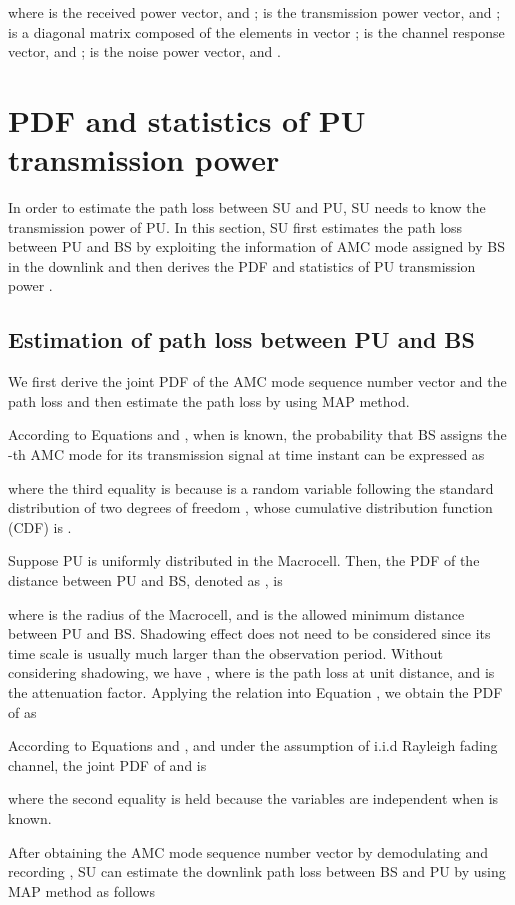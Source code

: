 \documentclass[conference]{IEEEtran}
\begin{document}
where  is the received power vector, and ;
 is the transmission power vector, and ;
 is a diagonal matrix composed of
the elements in vector ;  is the channel
response vector, and ;  is the noise power
vector, and .
\section{PDF and statistics of PU transmission power}
In order to estimate the path loss between SU and PU, SU needs to
know the transmission power of PU. In this section, SU first
estimates the path loss between PU and BS by exploiting the
information of AMC mode assigned by BS in the downlink and then
derives the PDF and statistics of PU transmission power
.
\subsection{Estimation of path loss  between PU and BS}
We first derive the joint PDF of the AMC mode sequence number vector
 and the path loss  and then estimate the path
loss  by using MAP method.

According to Equations  and , when  is known, the
probability that BS assigns the -th AMC mode for its
transmission signal at time instant  can be expressed as

where the third equality is because  is a random variable following the standard 
distribution of two degrees of freedom , whose cumulative
distribution function (CDF) is  \cite{c7}.

Suppose PU is uniformly distributed in the Macrocell. Then, the PDF
of the distance between PU and BS, denoted as , is

where  is the radius of the Macrocell, and  is the
allowed minimum distance between PU and BS. Shadowing effect does
not need to be considered since its time scale is usually much
larger than the observation period. Without considering shadowing,
we have , where  is the path loss at
unit distance, and  is the attenuation factor. Applying the
relation into Equation , we obtain the PDF of  as

According to Equations  and , and under the assumption of
i.i.d Rayleigh fading channel, the joint PDF of  and
 is

where the second equality is held because the variables  are independent when  is
known.

After obtaining the AMC mode sequence number vector  by
demodulating and recording ,
SU can estimate the downlink path loss between BS and PU by using
MAP method as follows
\end{document}
